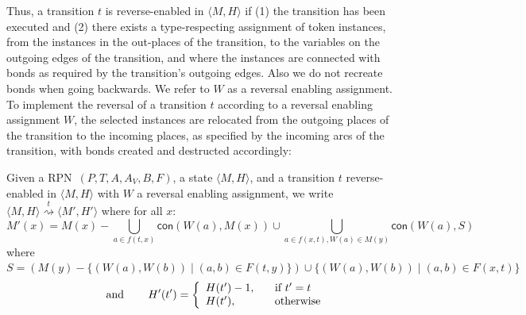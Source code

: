\documentclass[runningheads]{llncs}
\newcommand{\connected}{\mathsf{con}}
\newcommand{\state}[2]{\langle {#1}, {#2}\rangle}
\newcommand{\rtrans}[1]{\ensuremath{\stackrel{#1}{\rightsquigarrow}}}
\newcommand{\RPN}{\textsc{RPN\ }}
\begin{document}
Thus, a transition $t$ is reverse-enabled in $\state{M}{H}$ if  
(1) the transition has been executed and (2) there exists a type-respecting assignment of token instances,
from the instances in the out-places of the transition, to the variables on the outgoing
edges of the transition, and where the instances are connected with bonds as required by
the transition's outgoing edges.  Also we do not recreate bonds when going backwards. 
We refer to $W$ as a reversal enabling assignment.
To implement the reversal of a transition $t$ according to a reversal enabling assignment $W$, 
the selected instances are relocated from  the outgoing places of the transition to the incoming places,
as specified
by the incoming arcs of the transition, with bonds created and destructed accordingly:

\begin{definition}\label{causal}{\rm
		Given a \RPN $(P,T, A, A_V, B, F)$, 
		a state $\langle M, H\rangle$, and a transition $t$ reverse-enabled in $\state{M}{H}$  with 
		$W$ a reversal enabling assignment, we write $ \state{M}{H}
		\rtrans{t} \state{M'}{H'}$   where for all $x$:
		\[
		M'(x) =   M(x)- \bigcup_{a\in f(t,x)} \connected(W(a), M(x)) 
		\cup  \bigcup_{a\in f(x,t),W(a)\in M(y)} \connected(W(a),S)\]
		where $S= (M(y)
		-\{(W(a),W(b))\mid (a,b)\in F(t,y)\})\cup \{ (W(a),W(b))\mid (a,b)\in F(x,t) \}$
		\[
		\hspace{0.3in}\mbox{and}\hspace{0.3in}
		H'(t') = \left\{
		\begin{array}{ll}
		H(t') - 1, \hspace{0.3cm} \;\;\textrm{ if } t' = t  \; \\
		H(t'),\hspace{1cm}  \;\textrm{ otherwise }
		\end{array}
		\right.
		\]
}\end{definition}	
\end{document}
